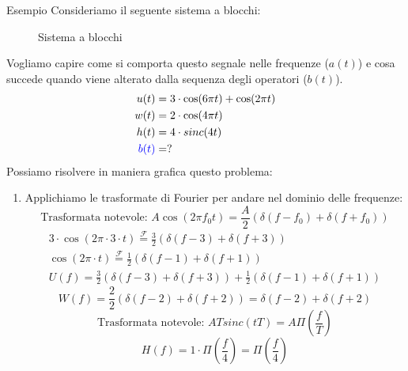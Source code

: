 \documentclass[a4paper]{article}
\begin{document}
\begin{examplebox}{Esempio}
  Consideriamo il seguente sistema a blocchi:
  \begin{figure}[H]
    \centering
    \caption{Sistema a blocchi}
  \end{figure}
  \noindent
  Vogliamo capire come si comporta questo segnale nelle frequenze ($a(t)$) e cosa succede quando
  viene alterato dalla sequenza degli operatori ($b(t)$).
  \[
    \begin{aligned}
      u(t) &= 3 \cdot \cos(6 \pi t) + \cos(2 \pi t)\\
      w(t) &= 2 \cdot \cos(4 \pi t) \\
      h(t) &= 4 \cdot sinc(4t)\\
      \color{blue}b(t) &= ?
    \end{aligned}
  \] 
  Possiamo risolvere in maniera grafica questo problema:
  \begin{enumerate}
    \item Applichiamo le trasformate di Fourier per andare nel dominio delle frequenze:
      \[
      \text{Trasformata notevole: } A \cos(2 \pi f_0 t) = \frac{A}{2} \left( \delta(f - f_0) + \delta(f + f_0) \right)
      \] 
      \[
        \begin{aligned}
          3 \cdot \cos(2 \pi \cdot 3 \cdot t) \stackrel{\mathcal{F}}{=} \frac{3}{2} \left( \delta(f - 3) + \delta(f + 3) \right)\\
          \cos(2 \pi \cdot t) \stackrel{\mathcal{F}}{=} \frac{1}{2} \left( \delta(f - 1) + \delta(f + 1) \right)\\
          U(f) = \frac{3}{2} \left( \delta(f - 3) + \delta(f + 3) \right) + \frac{1}{2} \left( \delta(f - 1) + \delta(f + 1) \right)
        \end{aligned}
      \] 
      \vspace{1em}
      \noindent
      \[
      W(f) = \frac{2}{2} \left( \delta(f - 2) + \delta(f + 2) \right) 
      = \delta(f - 2) + \delta(f + 2)
      \] 
      \vspace{1em}
      \noindent
      \[
        \text{Trasformata notevole: } AT sinc(tT) = A \Pi\left(\frac{f}{T}\right)
      \] 
      \[
        H(f) = 1 \cdot \Pi(\frac{f}{4}) = \Pi(\frac{f}{4})
      \] 


\end{enumerate}
\end{examplebox}
\end{document}
